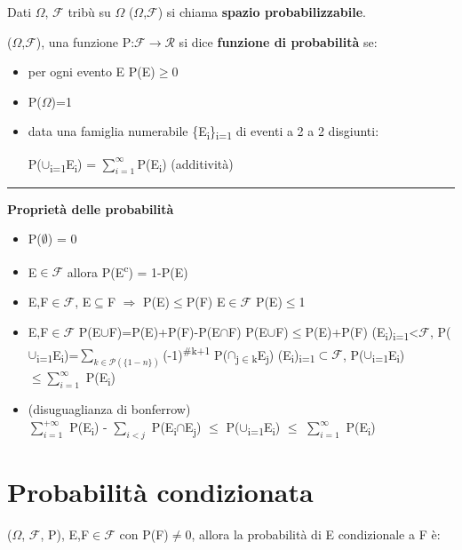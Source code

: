\documentclass[12pt, a4paper]{article}
\def\SPSB#1#2{\rlap{\textsuperscript{#1}}\SB{#2}}
\def\SP#1{\textsuperscript{#1}}
\def\SB#1{\textsubscript{#1}}
\def\separator{\begin{center}    \rule{100pt}{0.5pt}\end{center}}
\begin{document}
Dati $\Omega$, $\mathcal{F}$ tribù su $\Omega$ ($\Omega$,$\mathcal{F}$) si chiama \textbf{spazio probabilizzabile}.

($\Omega$,$\mathcal{F}$), una funzione P:$\mathcal{F}\rightarrow\mathcal{R}$ si dice
\textbf{funzione di probabilità} se:
\begin{itemize}
    \item per ogni evento E P(E)$\geq$0
    \item P($\Omega$)=1 
    \item data una famiglia numerabile \{E\SB{i}\}\SPSB{+$\infty$}{i=1} di eventi a 2 a 2 disgiunti:
    \begin{center}
        P($\cup$\SPSB{$\infty$}{i=1}E\SB{i}) = $\sum_{i=1}^{\infty}$P(E\SB{i}) (additività)
    \end{center}
\end{itemize}


\separator

\large{\textbf{Proprietà delle probabilità}}\normalsize
\begin{itemize}
    \item P($\emptyset$) = 0
    \item E$\in\mathcal{F}$ allora P(E\SP{c}) = 1-P(E)
    \item E,F$\in\mathcal{F}$, E$\subseteq$F $\Rightarrow$ P(E)$\leq$P(F)
    \subitem E$\in\mathcal{F}$ P(E)$\leq$1
    \item E,F$\in\mathcal{F}$ P(E$\cup$F)=P(E)+P(F)-P(E$\cap$F)
    \subitem P(E$\cup$F)$\leq$P(E)+P(F)
    \subitem (E\SB{i})\SPSB{n}{i=1}<$\mathcal{F}$, P($\cup$\SPSB{n}{i=1}E\SB{i})=$\sum_{k\in\mathcal{P}(\{1-n\})}$(-1)\SP{\#k+1}
    P($\cap$\SB{j$\in$k}E\SB{j})
    \subitem (E\SB{i})\SPSB{+$\infty$}{i=1}$\subset\mathcal{F}$, P($\cup$\SPSB{$\infty$}{i=1}E\SB{i})$\leq\sum_{i=1}^{\infty}$ 
    P(E\SB{i})
    \item (disuguaglianza di bonferrow) \\
    $\sum_{i=1}^{+\infty}$ P(E\SB{i}) - $\sum_{i<j}$ P(E\SB{i}$\cap$E\SB{j}) $\leq$ P($\cup$\SPSB{+$\infty$}{i=1}E\SB{i}) $\leq$ $\sum_{i=1}^{\infty}$ P(E\SB{i})
\end{itemize}




\section{Probabilità condizionata}

($\Omega$, $\mathcal{F}$, P), E,F$\in\mathcal{F}$ con P(F)$\neq$0, allora la probabilità di E condizionale a F è:
\end{document}
